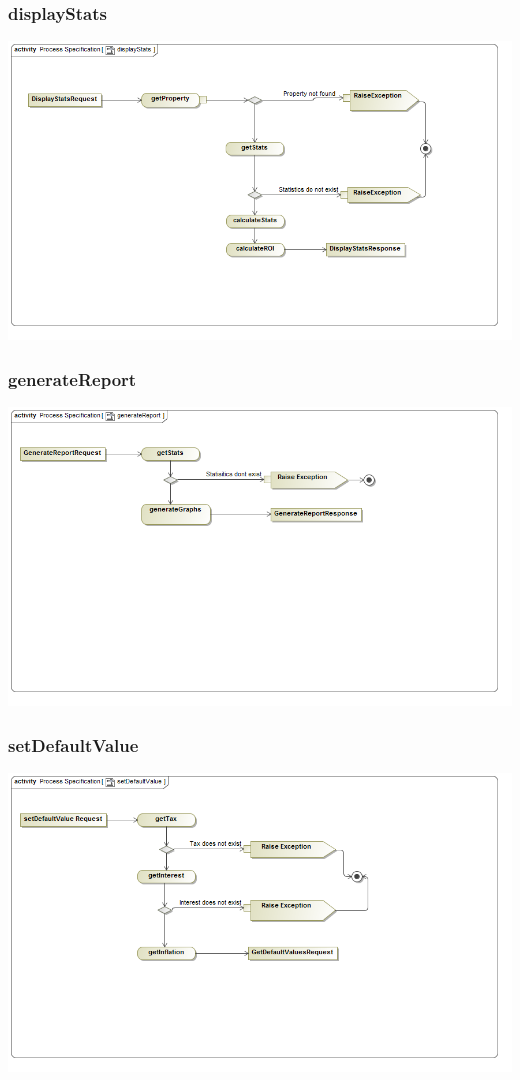 \documentclass[a4paper,12pt]{article}
\begin{document}
\subsubsection{displayStats}
\includegraphics[width=1\textwidth]{./Images/processSpecification/displayStats.png}
\subsubsection{generateReport}
\includegraphics[width=1\textwidth]{./Images/processSpecification/generateReport.png}
\subsubsection{setDefaultValue}
\includegraphics[width=1\textwidth]{./Images/processSpecification/setDefaultValue.png}
\end{document}

